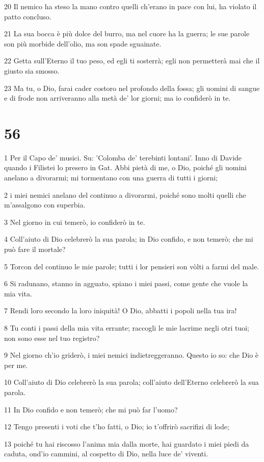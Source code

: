 \par 20 Il nemico ha steso la mano contro quelli ch'erano in pace con lui, ha violato il patto concluso.
\par 21 La sua bocca è più dolce del burro, ma nel cuore ha la guerra; le sue parole son più morbide dell'olio, ma son spade sguainate.
\par 22 Getta sull'Eterno il tuo peso, ed egli ti sosterrà; egli non permetterà mai che il giusto sia smosso.
\par 23 Ma tu, o Dio, farai cader costoro nel profondo della fossa; gli uomini di sangue e di frode non arriveranno alla metà de' lor giorni; ma io confiderò in te.

\chapter{56}

\par 1 Per il Capo de' musici. Su: 'Colomba de' terebinti lontani'. Inno di Davide quando i Filistei lo presero in Gat. Abbi pietà di me, o Dio, poiché gli uomini anelano a divorarmi; mi tormentano con una guerra di tutti i giorni;
\par 2 i miei nemici anelano del continuo a divorarmi, poiché sono molti quelli che m'assalgono con superbia.
\par 3 Nel giorno in cui temerò, io confiderò in te.
\par 4 Coll'aiuto di Dio celebrerò la sua parola; in Dio confido, e non temerò; che mi può fare il mortale?
\par 5 Torcon del continuo le mie parole; tutti i lor pensieri son vòlti a farmi del male.
\par 6 Si radunano, stanno in agguato, spiano i miei passi, come gente che vuole la mia vita.
\par 7 Rendi loro secondo la loro iniquità! O Dio, abbatti i popoli nella tua ira!
\par 8 Tu conti i passi della mia vita errante; raccogli le mie lacrime negli otri tuoi; non sono esse nel tuo registro?
\par 9 Nel giorno ch'io griderò, i miei nemici indietreggeranno. Questo io so: che Dio è per me.
\par 10 Coll'aiuto di Dio celebrerò la sua parola; coll'aiuto dell'Eterno celebrerò la sua parola.
\par 11 In Dio confido e non temerò; che mi può far l'uomo?
\par 12 Tengo presenti i voti che t'ho fatti, o Dio; io t'offrirò sacrifizi di lode;
\par 13 poiché tu hai riscosso l'anima mia dalla morte, hai guardato i miei piedi da caduta, ond'io cammini, al cospetto di Dio, nella luce de' viventi.

